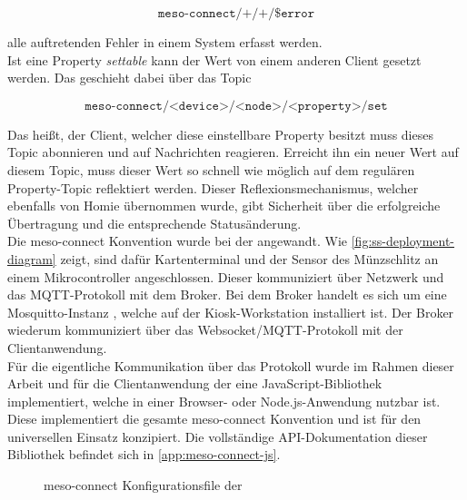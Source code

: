 \[\texttt{meso-connect/+/+/\$error} \]

alle auftretenden Fehler in einem System erfasst werden.\\

Ist eine Property \emph{settable} kann der Wert von einem anderen Client gesetzt werden. Das geschieht dabei 
über das Topic

\[\texttt{meso-connect/<device>/<node>/<property>/set} \]

Das heißt, der Client, welcher diese einstellbare Property besitzt muss dieses Topic abonnieren und
auf Nachrichten reagieren. Erreicht ihn ein neuer Wert auf diesem Topic, muss dieser Wert so schnell wie 
möglich auf dem regulären Property-Topic reflektiert werden. Dieser Reflexionsmechanismus, welcher ebenfalls von Homie
übernommen wurde, gibt Sicherheit über die erfolgreiche Übertragung und die entsprechende Statusänderung.\\

Die meso-connect Konvention wurde bei der \shst{} angewandt. Wie \autoref{fig:ss-deployment-diagram} zeigt,
sind dafür Kartenterminal und der Sensor des Münzschlitz an einem Mikrocontroller angeschlossen. Dieser
kommuniziert über Netzwerk und das MQTT-Protokoll mit dem Broker. Bei dem Broker handelt es sich um 
eine Mosquitto-Instanz \cite{mosquitto}, welche auf der Kiosk-Workstation installiert ist.
Der Broker wiederum kommuniziert über das Websocket/MQTT-Protokoll
mit der Clientanwendung.\\
Für die eigentliche Kommunikation über das Protokoll wurde im Rahmen dieser Arbeit und für die Clientanwendung 
der \shst{} eine JavaScript-Bibliothek implementiert, welche in einer Browser- oder Node.js-Anwendung
nutzbar ist. Diese implementiert die gesamte meso-connect Konvention und ist für den universellen Einsatz
konzipiert. Die vollständige API-Dokumentation dieser Bibliothek befindet sich in \autoref{app:meso-connect-js}.

\begin{figure}
  
  \caption{meso-connect Konfigurationsfile der \shst{}}
  \label{fig:shst-meso-connect-config}
\end{figure}

